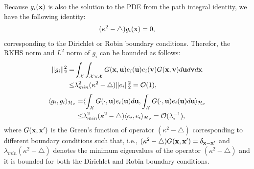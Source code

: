 \documentclass[aos,preprint]{imsart}
\theoremstyle{plain}
\newcommand{\CalO}{\mathcal O}
\newcommand{\CalH}{\mathcal H}
\newcommand{\CalX}{\mathcal X}
\newcommand{\Bx}{\bold x}
\newcommand{\BFx}{\bold x}
\newcommand{\Bu}{\bold u}
\theoremstyle{remark}
\begin{document}
\begin{appendix}
Because $g_i(\Bx)$ is also the solution to the PDE from the path integral identity, we have the following identity:
\begin{align*}
    (\kappa^2-\bigtriangleup)g_i(\Bx)=0,
\end{align*}
corresponding to the Dirichlet or Robin boundary conditions. Therefor, the RKHS norm and $L^2$ norm of $g_i$ can be bounded as follows:
\begin{align*}
    \|g_i\|_2^2=&\int_\CalX \int_{\CalX\times\CalX}G(\BFx,\Bu)e_i(\Bu)e_i(\bold{v})G(\BFx,\bold{v})d\Bu d\bold{v} d\BFx\\
    \leq & \lambda^2_{min}(\kappa^2-\bigtriangleup)\|e_i\|_2^2=\CalO(1),
\end{align*}
\begin{align*}
    \langle g_i,g_i\rangle_{\CalH_\nu}=& \langle \int_\CalX G(\cdot,\Bu)e_i(\Bu)d\Bu,\int_\CalX G(\cdot,\Bu)e_i(\Bu)d\Bu \rangle_{\CalH_\nu}\\
    \leq &  \lambda^2_{min}(\kappa^2-\bigtriangleup)\langle e_i,e_i\rangle_{\CalH_\nu}=\CalO(\lambda_i^{-1}),
\end{align*}
where  $G(\BFx,\BFx')$ is the Green's function of operator $(\kappa^2-\bigtriangleup)$ corresponding to different boundary conditions such that, i.e., $(\kappa^2-\bigtriangleup)G(\BFx,\BFx')=\delta_{\BFx-\BFx'}$ 
and $ \lambda_{min}(\kappa^2-\bigtriangleup)$ denotes the minimum eigenvalues of the operator $(\kappa^2-\bigtriangleup)$ and it is bounded for both the Dirichlet and Robin boundary conditions.




\end{appendix}
\end{document}
